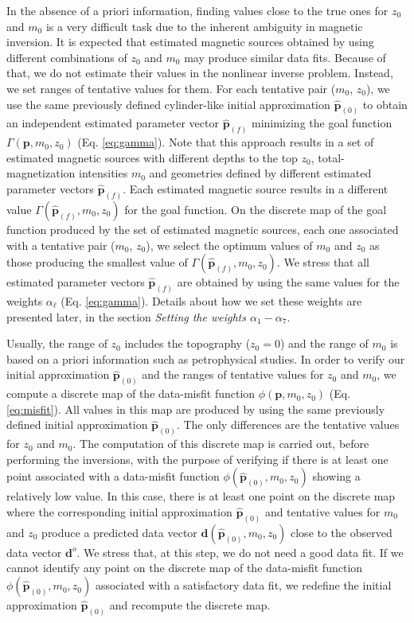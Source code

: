 In the absence of a priori information, finding values close to the true ones
for $z_0$ and $m_0$ is a very difficult task due to the inherent ambiguity
in magnetic inversion. It is expected that estimated magnetic sources obtained by
using different combinations of $z_0$ and $m_0$ may produce similar data fits.
Because of that, we do not estimate their values in the nonlinear inverse problem.
Instead, we set ranges of tentative values for them.
For each tentative pair ($m_0$, $z_0$), we use the same previously defined 
cylinder-like initial approximation $\hat{\mathbf{p}}_{(0)}$ to 
obtain an independent estimated parameter vector $\hat{\mathbf{p}}_{(f)}$ 
minimizing the goal function $\Gamma (\mathbf{p}, m_{0}, z_{0})$ 
(Eq. \ref{eq:gamma}).
Note that this approach results in a set of estimated magnetic sources with
different depths to the top $z_0$, total-magnetization intensities $m_0$ and 
geometries defined by different estimated parameter vectors $\hat{\mathbf{p}}_{(f)}$.
Each estimated magnetic source results in a different value 
$\Gamma (\hat{\mathbf{p}}_{(f)}, m_{0}, z_{0})$ for the goal function.
On the discrete map of the goal function produced by the set of estimated magnetic
sources, each one associated with a tentative pair ($m_0$, $z_0$), 
we select the optimum values of $m_{0}$ and $z_{0}$ as those producing the smallest
value of $\Gamma (\hat{\mathbf{p}}_{(f)}, m_{0}, z_{0})$. 
We stress that all estimated parameter vectors $\hat{\mathbf{p}}_{(f)}$ are obtained
by using the same values for the weights $\alpha_{\ell}$ (Eq. \ref{eq:gamma}).
Details about how we set these weights are presented later, in the section
\textit{Setting the weights $\alpha_{1}-\alpha_{7}$}.

Usually, the range of $z_0$ includes the topography ($z_0 = 0$) and the range of 
$m_0$ is based on a priori information such as petrophysical studies.
In order to verify our initial approximation $\hat{\mathbf{p}}_{(0)}$ and the
ranges of tentative values for $z_0$ and $m_0$, we compute a discrete map
of the data-misfit function $\phi (\mathbf{p}, m_{0}, z_{0})$ (Eq. \ref{eq:misfit}).
All values in this map are produced by using the same previously defined 
initial approximation $\hat{\mathbf{p}}_{(0)}$. The only differences are the 
tentative values for $z_0$ and $m_0$. 
The computation of this discrete map is carried out, before performing the 
inversions, with the purpose of verifying if there is at least one point 
associated with a data-misfit function $\phi (\hat{\mathbf{p}}_{(0)}, m_{0}, z_{0})$ 
showing a relatively low value. In this case, there is at least one point on the
discrete map where the corresponding initial approximation $\hat{\mathbf{p}}_{(0)}$
and tentative values for $m_{0}$ and $z_{0}$ produce a predicted data vector 
$\mathbf{d}(\hat{\mathbf{p}}_{(0)}, m_{0}, z_{0})$ close to the observed 
data vector $\mathbf{d}^{o}$.
We stress that, at this step, we do not need a good data fit.
If we cannot identify any point on the discrete map of the data-misfit function 
$\phi (\hat{\mathbf{p}}_{(0)}, m_{0}, z_{0})$ associated with a satisfactory
data fit, we redefine the initial approximation $\hat{\mathbf{p}}_{(0)}$ 
and recompute the discrete map.

